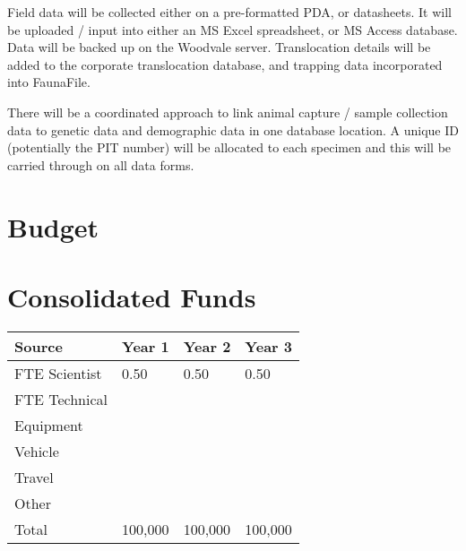 \documentclass[version=last,
    paper=a4,                               %
    10pt,                                   %
    dvipsnames,
    oneside,                              %
    headings=openany,                       %
    open=any,
    BCOR=7mm,                               %
    DIV=15,     %
]{scrbook}
\begin{document}
Field data will be collected either on a pre-formatted PDA, or
datasheets. It will be uploaded / input into either an MS Excel
spreadsheet, or MS Access database. Data will be backed up on the
Woodvale server. Translocation details will be added to the corporate
translocation database, and trapping data incorporated into FaunaFile.

There will be a coordinated approach to link animal capture / sample
collection data to genetic data and demographic data in one database
location. A unique ID (potentially the PIT number) will be allocated to
each specimen and this will be carried through on all data forms.




\section*{Budget}

\section*{Consolidated Funds }



\begin{longtabu} to \linewidth { |  X | X | X | X | }
\hline
{}
Source & Year 1 & Year 2 & Year 3\\
\hline
\endhead



FTE Scientist & 0.50 & 0.50 & 0.50\\



FTE Technical &  &  & \\



Equipment &  &  & \\



Vehicle &  &  & \\



Travel &  &  & \\



Other &  &  & \\



Total & 100,000 & 100,000 & 100,000\\


\hline
\end{longtabu}
\end{document}
